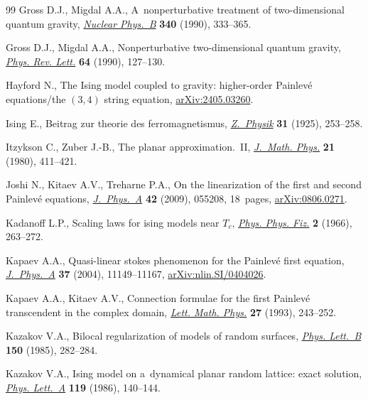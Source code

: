 \begin{thebibliography}{99}
Gross D.J., Migdal A.A., A~nonperturbative treatment of two-dimensional quantum
 gravity, \href{https://doi.org/10.1016/0550-3213(90)90450-R}{\textit{Nuclear
 Phys.~B}} \textbf{340} (1990), 333--365.

Gross D.J., Migdal A.A., Nonperturbative two-dimensional quantum gravity,
 \href{https://doi.org/10.1103/PhysRevLett.64.127}{\textit{Phys. Rev. Lett.}}
 \textbf{64} (1990), 127--130.

Hayford N., The {I}sing model coupled to gravity: higher-order {P}ainlev\'e
 equations/the $(3,4)$ string equation,
 \href{http://arxiv.org/abs/2405.03260}{arXiv:2405.03260}.

Ising E., Beitrag zur theorie des ferromagnetismus,
 \href{https://doi.org/10.1007/BF02980577}{\textit{Z.~Physik}} \textbf{31}
 (1925), 253--258.

Itzykson C., Zuber J.-B., The planar approximation.~{II},
 \href{https://doi.org/10.1063/1.524438}{\textit{J.~Math. Phys.}} \textbf{21}
 (1980), 411--421.

Joshi N., Kitaev A.V., Treharne P.A., On the linearization of the first and
 second {P}ainlev\'e equations,
 \href{https://doi.org/10.1088/1751-8113/42/5/055208}{\textit{J.~Phys.~A}}
 \textbf{42} (2009), 055208, 18~pages, \href{http://arxiv.org/abs/0806.0271}{arXiv:0806.0271}.

Kadanoff L.P., Scaling laws for ising models near {${T}_c$},
 \href{https://doi.org/10.1103/PhysicsPhysiqueFizika.2.263}{\textit{Phys.
 Phys. Fiz.}} \textbf{2} (1966), 263--272.

Kapaev A.A., Quasi-linear stokes phenomenon for the {P}ainlev\'e first
 equation,
 \href{https://doi.org/10.1088/0305-4470/37/46/005}{\textit{J.~Phys.~A}}
 \textbf{37} (2004), 11149--11167, \href{http://arxiv.org/abs/nlin.SI/0404026}{arXiv:nlin.SI/0404026}.

Kapaev A.A., Kitaev A.V., Connection formulae for the first {P}ainlev\'e
 transcendent in the complex domain,
 \href{https://doi.org/10.1007/BF00777371}{\textit{Lett. Math. Phys.}}
 \textbf{27} (1993), 243--252.

Kazakov V.A., Bilocal regularization of models of random surfaces,
 \href{https://doi.org/10.1016/0370-2693(85)91011-1}{\textit{Phys. Lett.~B}}
 \textbf{150} (1985), 282--284.

Kazakov V.A., Ising model on a~dynamical planar random lattice: exact solution,
 \href{https://doi.org/10.1016/0375-9601(86)90433-0}{\textit{Phys. Lett.~A}}
 \textbf{119} (1986), 140--144.


\end{thebibliography}

